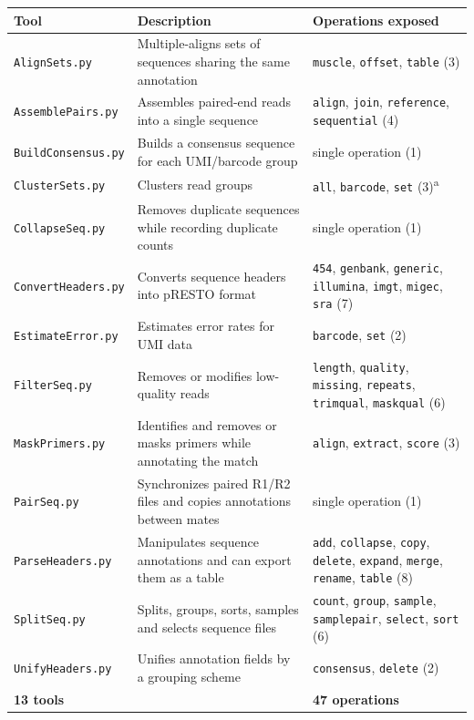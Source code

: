 \documentclass[11pt]{article}
\begin{document}
\begin{longtable}{p{}p{}p{}}
\toprule
Tool & Description & Operations exposed \\
\midrule
\endhead
\texttt{AlignSets.py} & Multiple-aligns sets of sequences sharing the same annotation & \texttt{muscle}, \texttt{offset}, \texttt{table} (3) \\
\texttt{AssemblePairs.py} & Assembles paired-end reads into a single sequence & \texttt{align}, \texttt{join}, \texttt{reference}, \texttt{sequential} (4) \\
\texttt{BuildConsensus.py} & Builds a consensus sequence for each UMI/barcode group & single operation (1) \\
\texttt{ClusterSets.py} & Clusters read groups & \texttt{all}, \texttt{barcode}, \texttt{set} (3)\textsuperscript{a} \\
\texttt{CollapseSeq.py} & Removes duplicate sequences while recording duplicate counts & single operation (1) \\
\texttt{ConvertHeaders.py} & Converts sequence headers into pRESTO format & \texttt{454}, \texttt{genbank}, \texttt{generic}, \texttt{illumina}, \texttt{imgt}, \texttt{migec}, \texttt{sra} (7) \\
\texttt{EstimateError.py} & Estimates error rates for UMI data & \texttt{barcode}, \texttt{set} (2) \\
\texttt{FilterSeq.py} & Removes or modifies low-quality reads & \texttt{length}, \texttt{quality}, \texttt{missing}, \texttt{repeats}, \texttt{trimqual}, \texttt{maskqual} (6) \\
\texttt{MaskPrimers.py} & Identifies and removes or masks primers while annotating the match & \texttt{align}, \texttt{extract}, \texttt{score} (3) \\
\texttt{PairSeq.py} & Synchronizes paired R1/R2 files and copies annotations between mates & single operation (1) \\
\texttt{ParseHeaders.py} & Manipulates sequence annotations and can export them as a table & \texttt{add}, \texttt{collapse}, \texttt{copy}, \texttt{delete}, \texttt{expand}, \texttt{merge}, \texttt{rename}, \texttt{table} (8) \\
\texttt{SplitSeq.py} & Splits, groups, sorts, samples and selects sequence files & \texttt{count}, \texttt{group}, \texttt{sample}, \texttt{samplepair}, \texttt{select}, \texttt{sort} (6) \\
\texttt{UnifyHeaders.py} & Unifies annotation fields by a grouping scheme & \texttt{consensus}, \texttt{delete} (2) \\
\midrule
\textbf{13 tools} & & \textbf{47 operations} \\
\bottomrule
\end{longtable}
\end{document}

